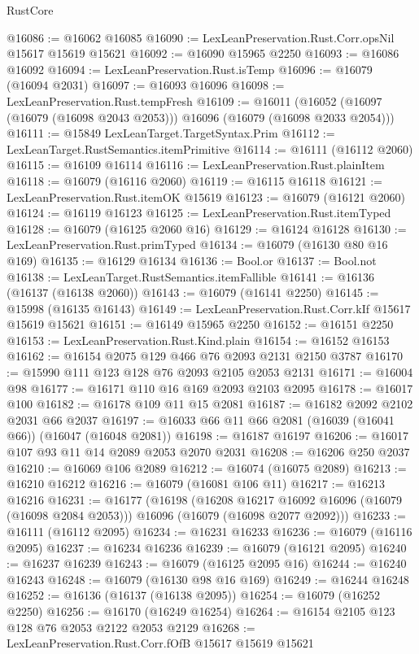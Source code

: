 \begin{lexlean}{RustCore}
\begin{coremodule}
@16086 := @16062 @16085
@16090 := LexLeanPreservation.Rust.Corr.opsNil @15617 @15619 @15621
@16092 := @16090 @15965 @2250
@16093 := @16086 @16092
@16094 := LexLeanPreservation.Rust.isTemp
@16096 := @16079 (@16094 @2031)
@16097 := @16093 @16096
@16098 := LexLeanPreservation.Rust.tempFresh
@16109 := @16011
    (@16052 (@16097 (@16079 (@16098 @2043 @2053))) @16096 (@16079 (@16098 @2033 @2054)))
@16111 := @15849 LexLeanTarget.TargetSyntax.Prim
@16112 := LexLeanTarget.RustSemantics.itemPrimitive
@16114 := @16111 (@16112 @2060)
@16115 := @16109 @16114
@16116 := LexLeanPreservation.Rust.plainItem
@16118 := @16079 (@16116 @2060)
@16119 := @16115 @16118
@16121 := LexLeanPreservation.Rust.itemOK @15619
@16123 := @16079 (@16121 @2060)
@16124 := @16119 @16123
@16125 := LexLeanPreservation.Rust.itemTyped
@16128 := @16079 (@16125 @2060 @16)
@16129 := @16124 @16128
@16130 := LexLeanPreservation.Rust.primTyped
@16134 := @16079 (@16130 @80 @16 @169)
@16135 := @16129 @16134
@16136 := Bool.or
@16137 := Bool.not
@16138 := LexLeanTarget.RustSemantics.itemFallible
@16141 := @16136 (@16137 (@16138 @2060))
@16143 := @16079 (@16141 @2250)
@16145 := @15998 (@16135 @16143)
@16149 := LexLeanPreservation.Rust.Corr.kIf @15617 @15619 @15621
@16151 := @16149 @15965 @2250
@16152 := @16151 @2250
@16153 := LexLeanPreservation.Rust.Kind.plain
@16154 := @16152 @16153
@16162 := @16154 @2075 @129 @466 @76 @2093 @2131 @2150 @3787
@16170 := @15990 @111 @123 @128 @76 @2093 @2105 @2053 @2131
@16171 := @16004 @98
@16177 := @16171 @110 @16 @169 @2093 @2103 @2095
@16178 := @16017 @100
@16182 := @16178 @109 @11 @15 @2081
@16187 := @16182 @2092 @2102 @2031 @66 @2037
@16197 := @16033 @66 @11 @66 @2081 (@16039 (@16041 @66)) (@16047 (@16048 @2081))
@16198 := @16187 @16197
@16206 := @16017 @107 @93 @11 @14 @2089 @2053 @2070 @2031
@16208 := @16206 @250 @2037
@16210 := @16069 @106 @2089
@16212 := @16074 (@16075 @2089)
@16213 := @16210 @16212
@16216 := @16079 (@16081 @106 @11)
@16217 := @16213 @16216
@16231 := @16177
    (@16198
      (@16208 @16217 @16092 @16096 (@16079 (@16098 @2084 @2053)))
      @16096
      (@16079 (@16098 @2077 @2092)))
@16233 := @16111 (@16112 @2095)
@16234 := @16231 @16233
@16236 := @16079 (@16116 @2095)
@16237 := @16234 @16236
@16239 := @16079 (@16121 @2095)
@16240 := @16237 @16239
@16243 := @16079 (@16125 @2095 @16)
@16244 := @16240 @16243
@16248 := @16079 (@16130 @98 @16 @169)
@16249 := @16244 @16248
@16252 := @16136 (@16137 (@16138 @2095))
@16254 := @16079 (@16252 @2250)
@16256 := @16170 (@16249 @16254)
@16264 := @16154 @2105 @123 @128 @76 @2053 @2122 @2053 @2129
@16268 := LexLeanPreservation.Rust.Corr.fOfB @15617 @15619 @15621

\end{coremodule}
\end{lexlean}
